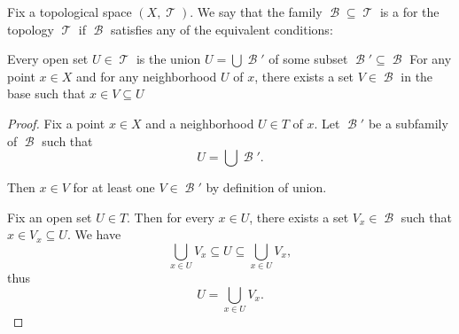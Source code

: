 \begin{definition}\label{def:topological_base}
  Fix a topological space \( (X, \mscrT) \). We say that the family \( \mscrB \subseteq \mscrT \) is a  for the topology \( \mscrT \) if \( \mscrB \) satisfies any of the equivalent conditions:
  \begin{thmenum}
     Every open set \( U \in \mscrT \) is the union \( U = \bigcup \mscrB' \) of some subset \( \mscrB' \subseteq \mscrB \)
     For any point \( x \in X \) and for any neighborhood \( U \) of \( x \), there exists a set \( V \in \mscrB \) in the base such that \( x \in V \subseteq U \)
  \end{thmenum}
\end{definition}
\begin{proof}
   Fix a point \( x \in X \) and a neighborhood \( U \in T \) of \( x \). Let \( \mscrB' \) be a subfamily of \( \mscrB \) such that
  \begin{equation*}
    U = \bigcup \mscrB'.
  \end{equation*}

  Then \( x \in V \) for at least one \( V \in \mscrB' \) by definition of union.

   Fix an open set \( U \in T \). Then for every \( x \in U \), there exists a set \( V_x \in \mscrB \) such that \( x \in V_x \subseteq U \). We have
  \begin{equation*}
    \bigcup_{x \in U} V_x \subseteq U \subseteq \bigcup_{x \in U} V_x,
  \end{equation*}
  thus
  \begin{equation*}
    U = \bigcup_{x \in U} V_x.
  \end{equation*}
\end{proof}

